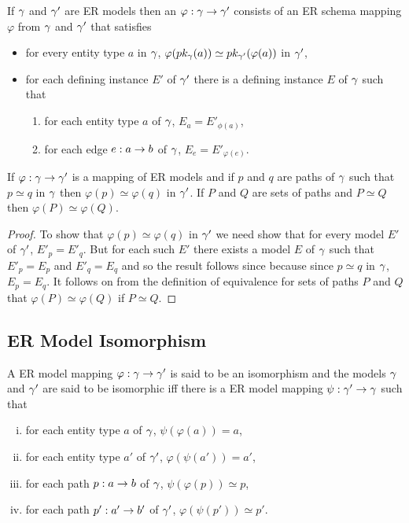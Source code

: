 \begin{definition}
If $\gmodel$ and  $\gmodel'$ are ER models then an 
$\varphi : \gmodel \morph \gmodel'$ consists of an ER schema mapping $\varphi$ from $\gmodel$ and  $\gmodel'$ that satisfies
\begin{itemize}
\item for every entity type $a$ in $\gmodel$, $\varphi(\pk{a}) \simeq \pk[\gmodel']{\varphi(a)}$
in $\gmodel'$,
\item  for each defining instance $E'$  of $\gmodel'$ there is a defining instance $E$ of $\gmodel$ such that
\begin{enumerate}
\item for each entity type $a$ of $\gmodel$, $E_a = E'_{\phi(a)}$,
\item for each edge $e:a \morph b$ of $\gmodel$, $E_e = E'_{\varphi(e)}$.
\end{enumerate} 
\end{itemize}
\end{definition}

\begin{lemma}
If $\varphi: \gmodel \morph \gmodel'$ is a mapping of ER models and
if $p$ and $q$ are paths of $\gmodel$ such that $p \simeq q$ in $\gmodel$ then $\varphi(p) \simeq \varphi(q)$ in $\gmodel'$. If $P$ and $Q$ are sets of paths and $P \simeq Q$ then $\varphi(P) \simeq \varphi(Q)$.
\end{lemma}
\begin{proof}
To show that $\varphi(p) \simeq \varphi(q)$ in $\gmodel'$ we need show that for every model $E'$ of $\gmodel'$, $E'_p=E'_q$. But for each such $E'$ there exists a model $E$ of $\gmodel$ such that $E'_p=E_p$ and $E'_q=E_q$ and so the result follows since because since $p\simeq q$ in $\gmodel$, $E_p=E_q$.
It follows on from the definition of equivalence for sets of paths $P$ and $Q$ that $\varphi(P) \simeq \varphi(Q)$ if $P \simeq Q$.
\end{proof}

\subsection{ER Model Isomorphism}

\begin{definition}
A ER model mapping $\varphi: \gmodel \morph \gmodel'$ is said to be an isomorphism
and the models $\gmodel$ and $\gmodel'$ are said to be isomorphic iff there is a ER model mapping $\psi: \gmodel' \morph \gmodel$ such that
\begin{enumerate}[(i)]
\item for each entity type $a$ of $\gmodel$, $\psi(\varphi(a))=a$,
\item for each entity type $a'$ of $\gmodel'$, $\varphi(\psi(a'))=a'$,
\item for each path $p: a \morph b$ of $\gmodel$, $\psi(\varphi(p)) \simeq p$,
\item for each path $p':a' \morph b'$ of $\gmodel'$, $\varphi(\psi(p')) \simeq p'$.
\end{enumerate}
\end{definition}


